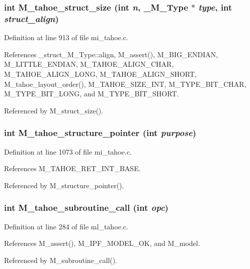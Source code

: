 \subsubsection{\setlength{\rightskip}{0pt plus 5cm}int M\_\-tahoe\_\-struct\_\-size (int {\em n}, \bf{\_\-M\_\-Type} $\ast$ {\em type}, int {\em struct\_\-align})}\label{m__tahoe_8h_adfbbd15234f02f71059c754902b91cb}




Definition at line 913 of file mi\_\-tahoe.c.

References \_\-struct\_\-M\_\-Type::align, M\_\-assert(), M\_\-BIG\_\-ENDIAN, M\_\-LITTLE\_\-ENDIAN, M\_\-TAHOE\_\-ALIGN\_\-CHAR, M\_\-TAHOE\_\-ALIGN\_\-LONG, M\_\-TAHOE\_\-ALIGN\_\-SHORT, M\_\-tahoe\_\-layout\_\-order(), M\_\-TAHOE\_\-SIZE\_\-INT, M\_\-TYPE\_\-BIT\_\-CHAR, M\_\-TYPE\_\-BIT\_\-LONG, and M\_\-TYPE\_\-BIT\_\-SHORT.

Referenced by M\_\-struct\_\-size().
\subsubsection{\setlength{\rightskip}{0pt plus 5cm}int M\_\-tahoe\_\-structure\_\-pointer (int {\em purpose})}\label{m__tahoe_8h_91ba5045032bb2398a6e709689f97b14}




Definition at line 1073 of file mi\_\-tahoe.c.

References M\_\-TAHOE\_\-RET\_\-INT\_\-BASE.

Referenced by M\_\-structure\_\-pointer().
\subsubsection{\setlength{\rightskip}{0pt plus 5cm}int M\_\-tahoe\_\-subroutine\_\-call (int {\em opc})}\label{m__tahoe_8h_792bddf43297fd172fb0ffc8b4982e5f}




Definition at line 284 of file ml\_\-tahoe.c.

References M\_\-assert(), M\_\-IPF\_\-MODEL\_\-OK, and M\_\-model.

Referenced by M\_\-subroutine\_\-call().
